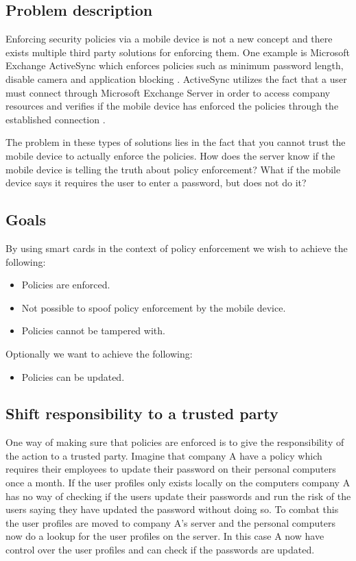 \subsection{Problem description}
Enforcing security policies via a mobile device is not a new concept and there exists multiple third party solutions for enforcing them. One example is Microsoft Exchange ActiveSync which enforces policies such as minimum password length, disable camera and application blocking \cite{exchangePolicies}. ActiveSync utilizes the fact that a user must connect through Microsoft Exchange Server in order to access company resources and verifies if the mobile device has enforced the policies through the established connection \cite{exchangePoliciesTech}.

The problem in these types of solutions lies in the fact that you cannot trust the mobile device to actually enforce the policies. How does the server know if the mobile device is telling the truth about policy enforcement? What if the mobile device says it requires the user to enter a password, but does not do it?

\subsection{Goals}
By using smart cards in the context of policy enforcement we wish to achieve the following:
\begin{itemize}
  \item Policies are enforced.
  \item Not possible to spoof policy enforcement by the mobile device.
  \item Policies cannot be tampered with.
\end{itemize}
Optionally we want to achieve the following:
\begin{itemize}
  \item Policies can be updated.
\end{itemize}

\subsection{Shift responsibility to a trusted party}
One way of making sure that policies are enforced is to give the responsibility of the action to a trusted party. Imagine that company A have a policy which requires their employees to update their password on their personal computers once a month. If the user profiles only exists locally on the computers company A has no way of checking if the users update their passwords and run the risk of the users saying they have updated the password without doing so. To combat this the user profiles are moved to company A's server and the personal computers now do a lookup for the user profiles on the server. In this case A now have control over the user profiles and can check if the passwords are updated.

